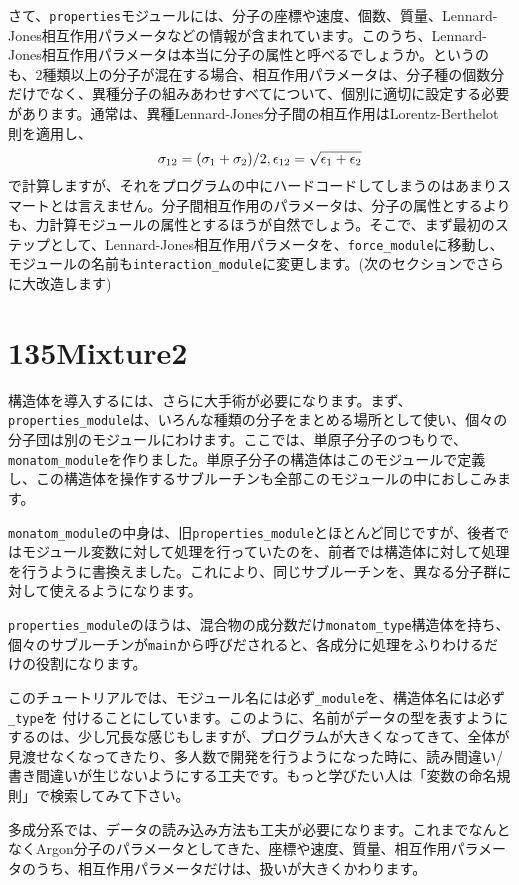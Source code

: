 \documentclass[a4,10pt]{article}
\begin{document}
さて、{\tt properties}モジュールには、分子の座標や速度、個数、質量、Lennard-Jones相互作用パラメータなどの情報が含まれています。このうち、Lennard-Jones相互作用パラメータは本当に分子の属性と呼べるでしょうか。というのも、2種類以上の分子が混在する場合、相互作用パラメータは、分子種の個数分だけでなく、異種分子の組みあわせすべてについて、個別に適切に設定する必要があります。通常は、異種Lennard-Jones分子間の相互作用はLorentz-Berthelot則を適用し、
\begin{equation}
 \sigma_{12} = (\sigma_1+\sigma_2)/2,\\
 \epsilon_{12} = \sqrt{\epsilon_1 + \epsilon_2}
 \end{equation}
で計算しますが、それをプログラムの中にハードコードしてしまうのはあまりスマートとは言えません。分子間相互作用のパラメータは、分子の属性とするよりも、力計算モジュールの属性とするほうが自然でしょう。そこで、まず最初のステップとして、Lennard-Jones相互作用パラメータを、{\tt force\_module}に移動し、モジュールの名前も{\tt interaction\_module}に変更します。(次のセクションでさらに大改造します)

\section{135Mixture2}

構造体を導入するには、さらに大手術が必要になります。まず、{\tt properties\_module}は、いろんな種類の分子をまとめる場所として使い、個々の分子団は別のモジュールにわけます。ここでは、単原子分子のつもりで、{\tt monatom\_module}を作りました。単原子分子の構造体はこのモジュールで定義し、この構造体を操作するサブルーチンも全部このモジュールの中におしこみます。

{\tt monatom\_module}の中身は、旧{\tt properties\_module}とほとんど同じですが、後者ではモジュール変数に対して処理を行っていたのを、前者では構造体に対して処理を行うように書換えました。これにより、同じサブルーチンを、異なる分子群に対して使えるようになります。

{\tt properties\_module}のほうは、混合物の成分数だけ{\tt monatom\_type}構造体を持ち、個々のサブルーチンが{\tt main}から呼びだされると、各成分に処理をふりわけるだけの役割になります。

\begin{shadebox}
    このチュートリアルでは、モジュール名には必ず{\tt \_module}を、構造体名には必ず{\tt \_type}を    付けることにしています。このように、名前がデータの型を表すようにするのは、少し冗長な感じもしますが、プログラムが大きくなってきて、全体が見渡せなくなってきたり、多人数で開発を行うようになった時に、読み間違い/書き間違いが生じないようにする工夫です。もっと学びたい人は「変数の命名規則」で検索してみて下さい。
\end{shadebox}
多成分系では、データの読み込み方法も工夫が必要になります。これまでなんとなくArgon分子のパラメータとしてきた、座標や速度、質量、相互作用パラメータのうち、相互作用パラメータだけは、扱いが大きくかわります。
\end{document}

